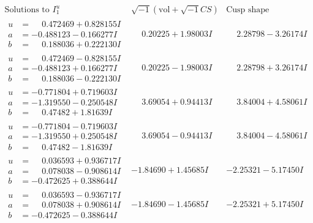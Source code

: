 \documentclass[1p]{elsarticle_modified}
\theoremstyle{definition}
\newcommand{\I}{\sqrt{-1}}
\begin{document}
$$\begin{array}{c|c|c}  
\text{Solutions to }I^u_{1}& \I (\text{vol} + \sqrt{-1}CS) & \text{Cusp shape}\\
 \hline 
\begin{aligned}
u &= \phantom{-}0.472469 + 0.828155 I \\
a &= -0.488123 - 0.166277 I \\
b &= \phantom{-}0.188036 + 0.222130 I\end{aligned}
 & \phantom{-}0.20225 + 1.98003 I & \phantom{-}2.28798 - 3.26174 I \\ \hline\begin{aligned}
u &= \phantom{-}0.472469 - 0.828155 I \\
a &= -0.488123 + 0.166277 I \\
b &= \phantom{-}0.188036 - 0.222130 I\end{aligned}
 & \phantom{-}0.20225 - 1.98003 I & \phantom{-}2.28798 + 3.26174 I \\ \hline\begin{aligned}
u &= -0.771804 + 0.719603 I \\
a &= -1.319550 - 0.250548 I \\
b &= \phantom{-}0.47482 + 1.81639 I\end{aligned}
 & \phantom{-}3.69054 + 0.94413 I & \phantom{-}3.84004 + 4.58061 I \\ \hline\begin{aligned}
u &= -0.771804 - 0.719603 I \\
a &= -1.319550 + 0.250548 I \\
b &= \phantom{-}0.47482 - 1.81639 I\end{aligned}
 & \phantom{-}3.69054 - 0.94413 I & \phantom{-}3.84004 - 4.58061 I \\ \hline\begin{aligned}
u &= \phantom{-}0.036593 + 0.936717 I \\
a &= \phantom{-}0.078038 - 0.908614 I \\
b &= -0.472625 + 0.388644 I\end{aligned}
 & -1.84690 + 1.45685 I & -2.25321 - 5.17450 I \\ \hline\begin{aligned}
u &= \phantom{-}0.036593 - 0.936717 I \\
a &= \phantom{-}0.078038 + 0.908614 I \\
b &= -0.472625 - 0.388644 I\end{aligned}
 & -1.84690 - 1.45685 I & -2.25321 + 5.17450 I \\ \hline\begin{aligned}

\end{aligned}
\end{array}$$
\end{document}
